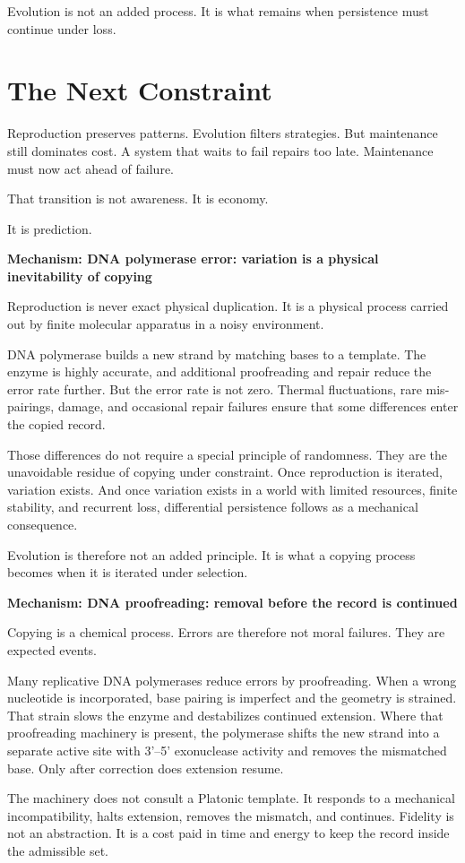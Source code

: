 \documentclass[11pt,twoside,openright]{book}
\newenvironment{mechanismbox}[1]
  {\begin{framed}\noindent\textbf{Mechanism: #1}\par\medskip}
  {\end{framed}}
\begin{document}
Evolution is not an added process. It is what remains when persistence must continue under loss.

\section*{The Next Constraint}

Reproduction preserves patterns. Evolution filters strategies. But maintenance still dominates cost. A system that waits to fail repairs too late. Maintenance must now act ahead of failure.

That transition is not awareness. It is economy.

It is prediction.

\begin{mechanismbox}{DNA polymerase error: variation is a physical inevitability of copying}
Reproduction is never exact physical duplication.
It is a physical process carried out by finite molecular apparatus in a noisy environment.

DNA polymerase builds a new strand by matching bases to a template. The enzyme is highly accurate, and additional proofreading and repair reduce the error rate further. But the error rate is not zero. Thermal fluctuations, rare mis-pairings, damage, and occasional repair failures ensure that some differences enter the copied record.

Those differences do not require a special principle of randomness. They are the unavoidable residue of copying under constraint. Once reproduction is iterated, variation exists. And once variation exists in a world with limited resources, finite stability, and recurrent loss, differential persistence follows as a mechanical consequence.

Evolution is therefore not an added principle.
It is what a copying process becomes when it is iterated under selection.
\end{mechanismbox}
\begin{mechanismbox}{DNA proofreading: removal before the record is continued}
Copying is a chemical process.
Errors are therefore not moral failures.
They are expected events.

Many replicative DNA polymerases reduce errors by proofreading. When a wrong nucleotide is incorporated, base pairing is imperfect and the geometry is strained. That strain slows the enzyme and destabilizes continued extension. Where that proofreading machinery is present, the polymerase shifts the new strand into a separate active site with 3'--5' exonuclease activity and removes the mismatched base. Only after correction does extension resume.

The machinery does not consult a Platonic template.
It responds to a mechanical incompatibility, halts extension, removes the mismatch, and continues.
Fidelity is not an abstraction.
It is a cost paid in time and energy to keep the record inside the admissible set.
\end{mechanismbox}
\end{document}
